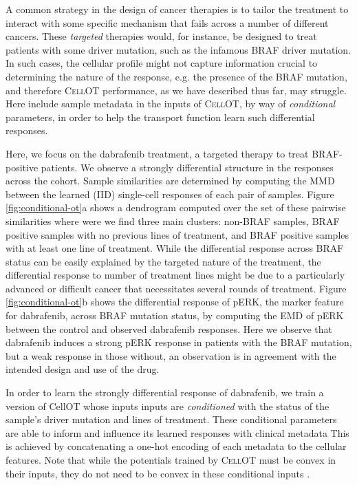 A common strategy in the design of cancer therapies is to tailor the treatment to interact with some specific mechanism that fails across a number of different cancers.
These \emph{targeted} therapies would, for instance, be designed to treat patients with some driver mutation, such as the infamous BRAF driver mutation.
In such cases, the cellular profile might not capture information crucial to determining the nature of the response, e.g. the presence of the BRAF mutation,
and therefore \textsc{CellOT} performance, as we have described thus far, may struggle.
Here include sample metadata in the inputs of \textsc{CellOT}, by way of \emph{conditional} parameters, in order to help the transport function learn such differential responses.

Here, we focus on the dabrafenib treatment, a targeted therapy to treat BRAF-positive patients.
We observe a strongly differential structure in the responses across the cohort.
Sample similarities are determined by computing the MMD between the learned (IID) single-cell responses of each pair of samples.
Figure \ref{fig:conditional-ot}a shows a dendrogram computed over the set of these pairwise similarities where were we find three main clusters: non-BRAF samples, BRAF positive samples with no previous lines of treatment, and BRAF positive samples with at least one line of treatment.
While the differential response across BRAF status can be easily explained by the targeted nature of the treatment, the differential response to number of treatment lines might be due to a particularly advanced or difficult cancer that necessitates several rounds of treatment.
Figure \ref{fig:conditional-ot}b shows the differential response of pERK, the marker feature for dabrafenib, across BRAF mutation status, by computing the EMD of pERK between the control and observed dabrafenib responses.
Here we observe that dabrafenib induces a strong pERK response in patients with the BRAF mutation, but a weak response in those without,
an observation is in agreement with the intended design and use of the drug.

In order to learn the strongly differential response of dabrafenib,
we train a version of CellOT whose inputs inputs are \emph{conditioned} \cite{bunne2022} with the status of the sample's driver mutation and lines of treatment. 
These conditional parameters are able to inform and influence its learned responses with clinical metadata
This is achieved by concatenating a one-hot encoding of each metadata to the cellular features.
Note that while the potentials trained by \textsc{CellOT} must be convex in their inputs,
they do not need to be convex in these conditional inputs \cite{amos2017}.

